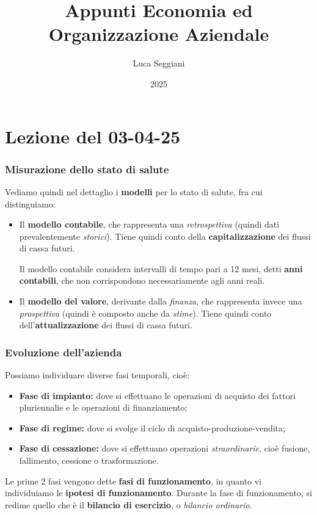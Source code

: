 \documentclass[a4paper,11pt]{article}
\title{Appunti Economia ed Organizzazione Aziendale}
\author{Luca Seggiani}
\date{2025}
\begin{document}
\section{Lezione del 03-04-25}

\thispagestyle{empty}
\pagestyle{fancy}

\subsubsection{Misurazione dello stato di salute}
Vediamo quindi nel dettaglio i \textbf{modelli} per lo stato di salute, fra cui distinguiamo:
\begin{itemize}
	\item Il \textbf{modello contabile}, che rappresenta una \textit{retrospettiva} (quindi dati prevalentemente \textit{storici}).
		Tiene quindi conto della \textbf{capitalizzazione} dei flussi di cassa futuri.
		
		Il modello contabile considera intervalli di tempo pari a 12 mesi, detti \textbf{anni contabili}, che non corrispondono necessariamente agli anni reali.
	\item Il \textbf{modello del valore}, derivante dalla \textit{finanza}, che rappresenta invece una \textit{prospettiva} (quindi è composto anche da \textit{stime}).
		Tiene quindi conto dell'\textbf{attualizzazione} dei flussi di cassa futuri.
\end{itemize}

\subsubsection{Evoluzione dell'azienda}
Possiamo individuare diverse fasi temporali, cioè:
\begin{itemize}
	\item \textbf{Fase di impianto:} dove si effettuano le operazioni di acquisto dei fattori pluriennalie e le operazioni di finanziamento;
	\item \textbf{Fase di regime:} dove si svolge il ciclo di acquisto-produzione-vendita;
	\item \textbf{Fase di cessazione:} dove si effettuano operazioni \textit{straordinarie}, cioè fusione, fallimento, cessione o trasformazione. 
\end{itemize}
Le prime 2 fasi vengono dette \textbf{fasi di funzionamento}, in quanto vi individuiamo le \textbf{ipotesi di funzionamento}.
Durante la fase di funzionamento, si redime quello che è il \textbf{bilancio di esercizio}, o \textit{bilancio ordinario}.
\end{document}

